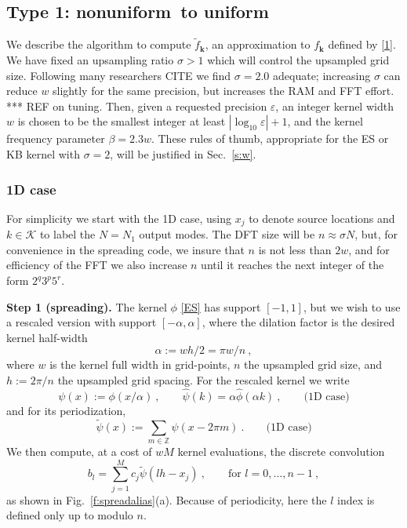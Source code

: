 \documentclass[10pt]{article}
\newcommand{\be}{\begin{equation}}
\newcommand{\ee}{\end{equation}}
\newcommand{\mbf}[1]{{\mathbf #1}}
\newcommand{\ZZ}{\mathbb{Z}}
\newcommand{\eps}{\varepsilon}
\newcommand{\bigO}{{\mathcal O}}
\newcommand{\kk}{\mbf{k}}
\newcommand{\KK}{{\mathcal K}}
\newcommand{\NU}{{nonuniform}}
\newcommand{\U}{{uniform}}
\newcommand{\freq}{\beta}          %
\newcommand{\rat}{\sigma}          %
\newcommand{\ppsi}{{\tilde\psi}}   %
\newcommand{\al}{\alpha}           %
\begin{document}
\subsection{Type 1: \NU\ to \U}

We describe the algorithm to compute $\tilde f_\kk$, an approximation
to $f_\kk$ defined by \eqref{1}.
We have fixed an upsampling ratio $\rat>1$ which will control the
upsampled grid size.
Following many researchers CITE we find $\rat=2.0$ adequate;
increasing $\rat$ can reduce $w$ slightly for the same precision,
but increases the RAM and FFT effort.
*** REF on tuning.
Then, given a requested precision $\eps$,
an integer kernel width $w$ is chosen
to be the smallest integer at least $|\log_{10} \eps| + 1$,
and the kernel frequency parameter $\freq = 2.3 w$.
These rules of thumb, appropriate for the ES or KB kernel with
$\rat=2$, will be justified in Sec.~\ref{s:w}.

\subsubsection{1D case}

For simplicity we start with the 1D case, using $x_j$ to denote source
locations and $k\in\KK$ to label the $N=N_1$ output modes.
The DFT size will be $n \approx \rat N$,
but, for convenience in the spreading code, we insure that $n$
is not less than $2w$,
and for efficiency of the FFT we also increase $n$ until it reaches the next
integer of the form $2^q3^p5^r$.

{\bf Step 1 (spreading).}
The kernel $\phi$ \eqref{ES} has support $[-1,1]$, but we wish to
use a rescaled version with support $[-\al,\al]$, where
the dilation factor is the desired kernel half-width
\be
\alpha := wh/2 = \pi w/n
~,
\label{al}
\ee
where $w$ is the kernel full width in grid-points, $n$
the upsampled grid size, and $h := 2\pi/n$ the upsampled grid spacing.
For the rescaled kernel we write
\be
\psi(x) := \phi(x/\al)~,
\qquad \hat\psi(k) = \al \hat\phi(\al k)~,
\qquad \mbox{(1D case)}
\label{psi1}
\ee
and for its periodization,
\be
\ppsi(x) := \sum_{m\in\ZZ} \psi(x-2\pi m)
~.
\qquad \mbox{(1D case)}
\label{ppsi1}
\ee
We then compute, at a cost of $wM$ kernel evaluations, %
the discrete convolution
\be
b_l = \sum_{j=1}^M c_j \ppsi(lh - x_j)
~, \qquad \mbox{for } l=0,\dots,n-1
~,
\label{bl1}
\ee
as shown in Fig.~\ref{f:spreadalias}(a).
Because of periodicity, here the $l$ index is defined only up to modulo $n$.
\end{document}
